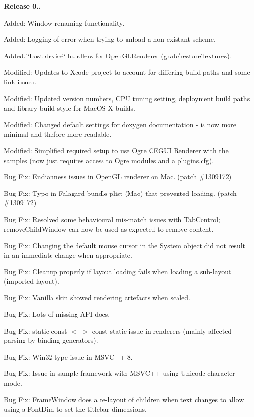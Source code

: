 {\bfseries{Release 0..}}
\begin{DoxyItemize}
\item Added\+: Window renaming functionality.
\item Added\+: Logging of error when trying to unload a non-\/existant scheme.
\item Added\+: \char`\"{}\+Lost device\char`\"{} handlers for Open\+G\+L\+Renderer (grab/restore\+Textures).
\item Modified\+: Updates to Xcode project to account for differing build paths and some link issues.
\item Modified\+: Updated version numbers, C\+PU tuning setting, deployment build paths and library build style for Mac\+OS X builds.
\item Modified\+: Changed default settings for doxygen documentation -\/ is now more minimal and thefore more readable.
\item Modified\+: Simplified required setup to use Ogre C\+E\+G\+UI Renderer with the samples (now just requires access to Ogre modules and a plugins.\+cfg).
\item Bug Fix\+: Endianness issues in Open\+GL renderer on Mac. (patch \#1309172)
\item Bug Fix\+: Typo in Falagard bundle plist (Mac) that prevented loading. (patch \#1309172)
\item Bug Fix\+: Resolved some behavioural mis-\/match issues with Tab\+Control; remove\+Child\+Window can now be used as expected to remove content.
\item Bug Fix\+: Changing the default mouse cursor in the System object did not result in an immediate change when appropriate.
\item Bug Fix\+: Cleanup properly if layout loading fails when loading a sub-\/layout (imported layout).
\item Bug Fix\+: \textquotesingle{}Vanilla\textquotesingle{} skin showed rendering artefacts when scaled.
\item Bug Fix\+: Lots of missing A\+PI docs.
\item Bug Fix\+: \textquotesingle{}static const\textquotesingle{} $<$-\/$>$ \textquotesingle{}const static\textquotesingle{} issue in renderers (mainly affected parsing by binding generators).
\item Bug Fix\+: Win32 type issue in M\+S\+V\+C++ 8.
\item Bug Fix\+: Issue in sample framework with M\+S\+V\+C++ using Unicode character mode.
\item Bug Fix\+: Frame\+Window does a re-\/layout of children when text changes to allow using a Font\+Dim to set the titlebar dimensions.

\end{DoxyItemize}

